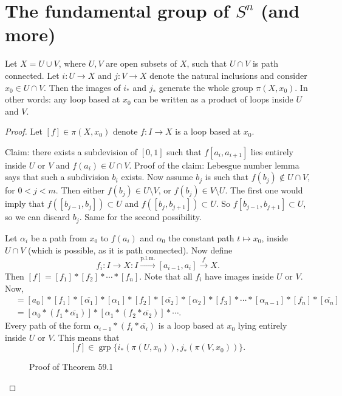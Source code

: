 \section{The fundamental group of $S^n$ (and more)}
\begin{theorem}[59.1]
    Let $X = U \cup V$, where $U, V$ are open subsets of $X$, such that $U \cap  V$ is path connected.
    Let $i : U \to X$ and $j: V \to X$ denote the natural inclusions and consider $x_0 \in  U \cap V$.
    Then the images of $i_*$ and $j_*$ generate the whole group $\pi(X, x_0)$.
    In other words: any loop based at $x_0$ can be written as a product of loops inside $U$ and $V$.
\end{theorem}
\begin{proof}
    Let $[f] \in \pi(X, x_0)$ denote $f: I \to X$ is a loop based at $x_0$.

    Claim: there exists a subdevision of $[0, 1]$ such that  $f[a_i, a_{i+1}]$ lies entirely inside $U$ or $V$ and $f(a_i) \in  U \cap V$.
    Proof of the claim: Lebesgue number lemma says that such a subdivision $b_i$ exists.
    Now assume $b_j$ is such that $f(b_j) \not\in U\cap V$, for $0 < j < m$.
    Then either $f(b_j) \in U \setminus V$, or $f(b_j) \in V \setminus U$.
    The first one would imply that $f([b_{j-1}, b_j]) \subset U$ and $f([b_j, b_{j+1}]) \subset U$.
    So $f[b_{j-1}, b_{j+1}] \subset U$, so we can discard $b_j$.
    Same for the second possibility.

    Let $\alpha_i$ be a path from $x_0$ to $f(a_i)$ and $\alpha_0$ the constant path  $t \mapsto  x_0$, inside $U \cap V$ (which is possible, as it is path connected).
    Now define
    \[
        f_i: I \to X : I \xrightarrow{\text{p.l.m.}} [a_{i-1}, a_i] \xrightarrow{f} X 
    .\]
    Then $[f] = [f_1] * [f_2] * \cdots * [f_n]$.
    Note that all $f_i$ have images inside $U$ or $V$.
    Now,
    \begin{align*}
        [f] &= [a_0] * [f_1] * [\overline{\alpha_1}] * [\alpha_1] * [f_2] * [\overline{\alpha_2}] * [\alpha_2] * [f_3] * \cdots * [\alpha_{n-1}] * [f_n] * [\overline{\alpha_n}]\\
            &= [\alpha_0 * (f_1 * \overline{\alpha_1})] * [\alpha_1 * (f_2 * \overline{\alpha_2})] * \cdots
    .\end{align*}
    Every path of the form $\alpha_{i-1} * (f_i * \overline{\alpha_i})$ is a loop based at $x_0$ lying entirely inside $U$ or $V$.
    This means that
    \[
        [f] \in  \operatorname{grp} \{i_*(\pi(U, x_0)), j_*(\pi(V, x_0))\} 
    .\] 
\begin{figure}[H]
    \centering
    \caption{Proof of Theorem 59.1}
    \label{fig:theorem-59-1}
\end{figure}
\end{proof}

